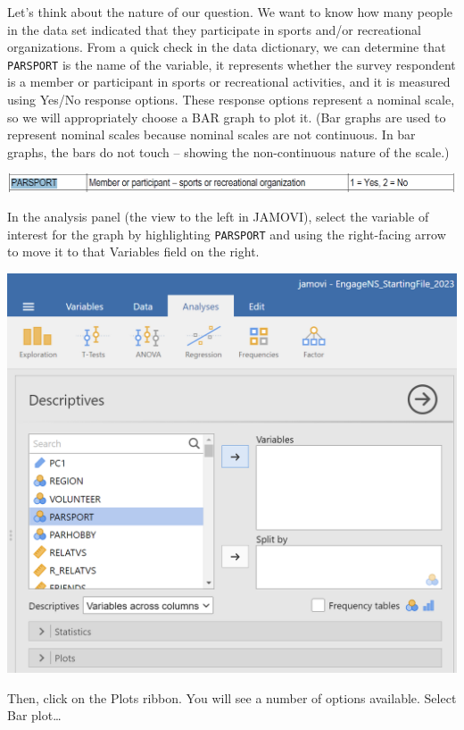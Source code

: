 \documentclass[
]{book}
\begin{document}
Let's think about the nature of our question. We want to know how many people in the data set indicated that they participate in sports and/or recreational organizations. From a quick check in the data dictionary, we can determine that \texttt{PARSPORT} is the name of the variable, it represents whether the survey respondent is a member or participant in sports or recreational activities, and it is measured using Yes/No response options. These response options represent a nominal scale, so we will appropriately choose a BAR graph to plot it. (Bar graphs are used to represent nominal scales because nominal scales are not continuous. In bar graphs, the bars do not touch -- showing the non-continuous nature of the scale.)

\includegraphics{img/PARSPORTinDataDictionary.png}

In the analysis panel (the view to the left in JAMOVI), select the variable of interest for the graph by highlighting \texttt{PARSPORT} and using the right-facing arrow to move it to that Variables field on the right.

\includegraphics{img/MovingPARSPORTToVarField.png}

Then, click on the {Plots} ribbon. You will see a number of options available. Select {Bar plot}\ldots{}
\end{document}
